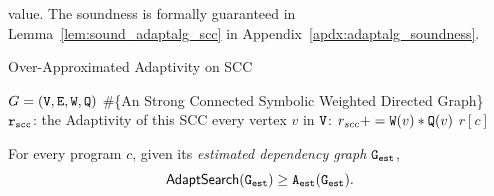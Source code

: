 value.%
The soundness is formally guaranteed in Lemma~\ref{lem:sound_adaptalg_scc} in Appendix~\ref{apdx:adaptalg_soundness}.

        \begin{algorithm}
          \caption{
          {Over-Approximated Adaptivity on SCC}
          \label{alg:overadp_alg}
          }
          \begin{algorithmic}[1]
          \REQUIRE $G = (\mathtt{V}, \mathtt{E}, \mathtt{W}, \mathtt{Q})$ \#\{An Strong Connected Symbolic Weighted Directed Graph\}
          \\
          $\mathtt{r_{scc}}$: the Adaptivity of this SCC
           every vertex $v$ in $\mathtt{V}$:
          \STATE  \qquad $r_{scc} += \mathtt{W}(v)*\mathtt{Q}(v)$  
          \RETURN $r[c]$
          \end{algorithmic}
          \end{algorithm}
\begin{thm}
    \label{thm:sound_adaptalg}
    For every program $c$, given its \emph{estimated dependency graph} $\mathtt{{G_{est}}}$,
     $$\mathsf{AdaptSearch}(\mathtt{{G_{est}}}) \geq {\ensuremath{\mathtt{A_{est}}}}(\mathtt{{G_{est}}}).$$
\end{thm}